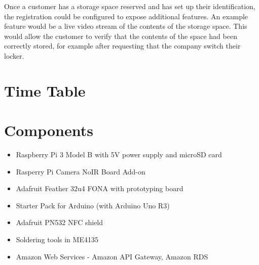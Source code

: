 \documentclass{article}
\begin{document}
Once a customer has a storage space reserved and has set up their identification, the registration could be configured
to expose additional features. An example feature would be a live video stream of the contents of the storage space.
This would allow the customer to verify that the contents of the space had been correctly stored, for example after
requesting that the company switch their locker.

\section{Time Table}


\lipsum[1]

\section{Components}

\begin{itemize}
	\item Raspberry Pi 3 Model B with 5V power supply and microSD card
	\item Rasperry Pi Camera NoIR Board Add-on
	\item Adafruit Feather 32u4 FONA with prototyping board
	\item Starter Pack for Arduino (with Arduino Uno R3)
	\item Adafruit PN532 NFC shield
	\item Soldering tools in ME4135
	\item Amazon Web Services - Amazon API Gateway, Amazon RDS
\end{itemize}

\pagebreak
\end{document}

